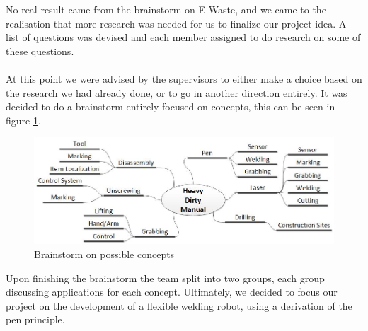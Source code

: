 No real result came from the brainstorm on E-Waste, and we came to the realisation that more research was needed for us to finalize our project idea. A list of questions was devised and each member assigned to do research on some of these questions. \\~~\\
At this point we were advised by the supervisors to either make a choice based on the research we had already done, or to go in another direction entirely. It was decided to do a brainstorm entirely focused on concepts, this can be seen in figure \ref{fig:conceptsBrainstorm}.

\begin{figure}[!ht]
	\centering
	\includegraphics[scale=.5]{./graphics/conceptsBrainstorm.jpg}
	\caption{Brainstorm on possible concepts}
	\label{fig:conceptsBrainstorm}
\end{figure}

Upon finishing the brainstorm the team split into two groups, each group discussing applications for each concept. Ultimately, we decided to focus our project on the development of a flexible welding robot, using a derivation of the pen principle.
